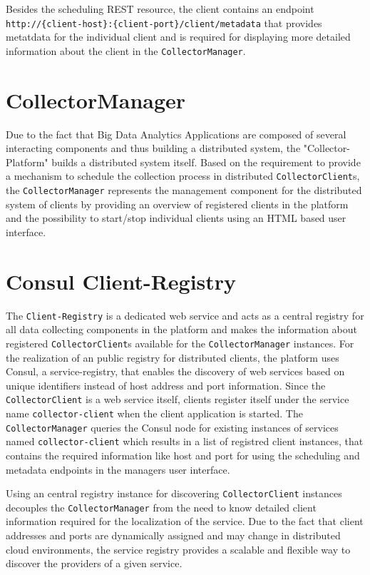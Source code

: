 Besides the scheduling REST resource, the client contains an endpoint \newline \verb|http://{client-host}:{client-port}/client/metadata|
that provides metatdata for the individual client and is required
for displaying more detailed information about the client in the \verb|CollectorManager|.

\section{CollectorManager}
\label{sec:arch-collector-manager}
Due to the fact that Big Data Analytics Applications are composed of several interacting components and thus building
a distributed system, the "Collector-Platform" builds a distributed system itself. Based on the requirement to provide a
mechanism to schedule the collection process in distributed \verb|CollectorClient|s, the \verb|CollectorManager| represents the management
component for the distributed system of clients by providing an overview of registered clients in the platform and
the possibility to start/stop individual clients using an HTML based user interface.

\section{Consul Client-Registry}

The \verb|Client-Registry| is a dedicated web service and acts as a central registry for all data collecting components
in the platform and makes the information about registered \verb|CollectorClient|s available for the \verb|CollectorManager| instances.
For the realization of an public registry for distributed clients, the platform uses Consul, a service-registry, that enables the discovery
of web services based on unique identifiers instead of host address and port information. Since the \verb|CollectorClient| is a web service itself,
clients register itself under the service name \verb|collector-client| when the client application is started. The \verb|CollectorManager|
queries the Consul node for existing instances of services named \verb|collector-client| which results in a list of registred client instances,
that contains the required information like host and port for using the scheduling and metadata endpoints in the managers user interface.

Using an central registry instance for discovering \verb|CollectorClient| instances decouples the \verb|CollectorManager| from the
need to know detailed client information required for the localization of the service. Due to the fact that
client addresses and ports are dynamically assigned and may change in distributed cloud environments, the service registry provides
a scalable and flexible way to discover the providers of a given service.

